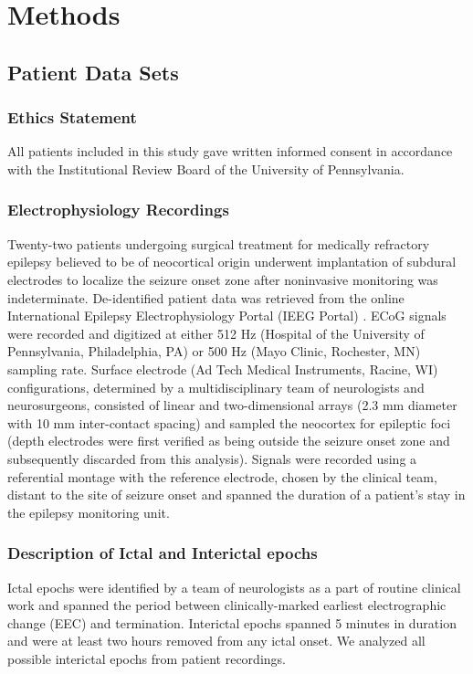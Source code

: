 \section{Methods}
\subsection{Patient Data Sets}
\subsubsection{Ethics Statement}
All patients included in this study gave written informed consent in accordance with the Institutional Review Board of the University of Pennsylvania.

\subsubsection{Electrophysiology Recordings}
Twenty-two patients undergoing surgical treatment for medically refractory epilepsy believed to be of neocortical origin underwent implantation of subdural electrodes to localize the seizure onset zone after noninvasive monitoring was indeterminate. De-identified patient data was retrieved from the online International Epilepsy Electrophysiology Portal (IEEG Portal) \cite{wagenaar2013multimodal}. ECoG signals were recorded and digitized at either 512 Hz (Hospital of the University of Pennsylvania, Philadelphia, PA) or 500 Hz (Mayo Clinic, Rochester, MN) sampling rate. Surface electrode (Ad Tech Medical Instruments, Racine, WI) configurations, determined by a multidisciplinary team of neurologists and neurosurgeons, consisted of linear and two-dimensional arrays (2.3 mm diameter with 10 mm inter-contact spacing) and sampled the neocortex for epileptic foci (depth electrodes were first verified as being outside the seizure onset zone and subsequently discarded from this analysis). Signals were recorded using a referential montage with the reference electrode, chosen by the clinical team, distant to the site of seizure onset and spanned the duration of a patient's stay in the epilepsy monitoring unit.

\subsubsection{Description of Ictal and Interictal epochs}
Ictal epochs were identified by a team of neurologists as a part of routine clinical work and spanned the period between clinically-marked earliest electrographic change (EEC) \cite{litt2001epileptic} and termination. Interictal epochs spanned 5 minutes in duration and were at least two hours removed from any ictal onset. We analyzed all possible interictal epochs from patient recordings. 

